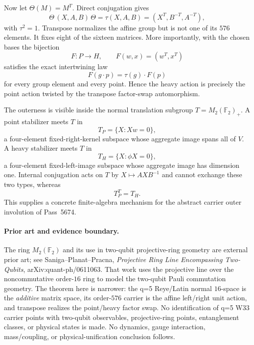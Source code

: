 Now let $\Theta(M)=M^T$.  Direct conjugation gives
\[
 \boxed{
 \Theta\,(X,A,B)\,\Theta
 =\tau(X,A,B)
 =(X^T,B^{-T},A^{-T}),
 }
\]
with $\tau^2=1$.  Transpose normalizes the affine group but is not one of its
$576$ elements.  It fixes eight of the sixteen matrices.  More importantly,
with the chosen bases the bijection
\[
 \boxed{F:P\to H,\qquad F(w,x)=(w^T,x^T)}
\]
satisfies the exact intertwining law
\[
 \boxed{F(g\cdot p)=\tau(g)\cdot F(p)}
\]
for every group element and every point.  Hence the heavy action is precisely
the point action twisted by the transpose factor-swap automorphism.

The outerness is visible inside the normal translation subgroup
$T=M_2(\mathbb F_2)_+$.  A point stabilizer meets $T$ in
\[
 T_P=\{X:Xw=0\},
\]
a four-element fixed-right-kernel subspace whose aggregate image spans all of
$V$.  A heavy stabilizer meets $T$ in
\[
 T_H=\{X:\phi X=0\},
\]
a four-element fixed-left-image subspace whose aggregate image has dimension
one.  Internal conjugation acts on $T$ by $X\mapsto AXB^{-1}$ and cannot
exchange these two types, whereas
\[
 \boxed{T_P^T=T_H.}
\]
This supplies a concrete finite-algebra mechanism for the abstract carrier
outer involution of Pass~5674.

\paragraph{Prior art and evidence boundary.}
The ring $M_2(\mathbb F_2)$ and its use in two-qubit projective-ring geometry
are external prior art; see Saniga--Planat--Pracna,
\emph{Projective Ring Line Encompassing Two-Qubits}, arXiv:quant-ph/0611063.
That work uses the projective line over the noncommutative order-$16$ ring to
model the two-qubit Pauli commutation geometry.  The theorem here is narrower:
the q=5 Reye/Latin normal $16$-space is the \emph{additive} matrix space, its
order-$576$ carrier is the affine left/right unit action, and transpose
realizes the point/heavy factor swap.  No identification of q=5 W33 carrier
points with two-qubit observables, projective-ring points, entanglement classes,
or physical states is made.  No dynamics, gauge interaction, mass/coupling, or
physical-unification conclusion follows.
